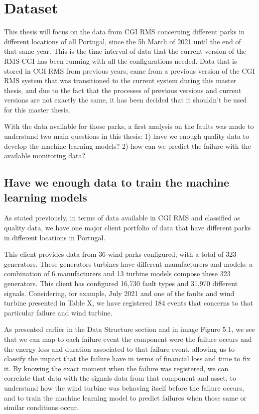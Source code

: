 \section{Dataset}
\label{sub:if_you_use_this_template} 
This thesis will focus on the data from CGI RMS concerning different parks in different locations of all Portugal, since the 5h March of 2021 until the end of that same year. This is the time interval of data that the current version of the RMS CGI has been running with all the configurations needed. Data that is stored in CGI RMS from previous years, came from a previous version of the CGI RMS system that was transitioned to the current system during this master thesis, and due to the fact that the processes of previous versions and current versions are not exactly the same, it has been decided that it shouldn't be used for this master thesis.

With the data available for those parks, a first analysis on the faults was made to understand two main questions in this thesis: 1) have we enough quality data to develop the machine learning models? 2) how can we predict the failure with the available monitoring data? 

\subsection{Have we enough data to train the machine learning models} 
\label{sub:if_you_use_this_template} 

As stated previously, in terms of data available in CGI RMS and classified as quality data, we have one major client portfolio of data that have different parks in different locations in Portugal.

This client provides data from 36 wind parks configured, with a total of 323 generators. These generators turbines have different manufacturers and models: a combination of 6 manufacturers and 13 turbine models compose these 323 generators. This client has configured 16,730 fault types and 31,970 different signals.
Considering, for example, July 2021 and one of the faults and wind turbine presented in Table X, we have registered 184 events that concerns to that particular failure and wind turbine.

As presented earlier in the Data Structure section and in image Figure 5.1, we see that we can map to each failure event the component were the failure occurs and the energy loss and duration associated to that failure event, allowing us to classify the impact that the failure have in terms of financial loss and time to fix it. By knowing the exact moment when the failure was registered, we can correlate that data with the signals data from that component and asset, to understand how the wind turbine was behaving itself before the failure occurs, and to train the machine learning model to predict failures when those same or similar conditions occur.

